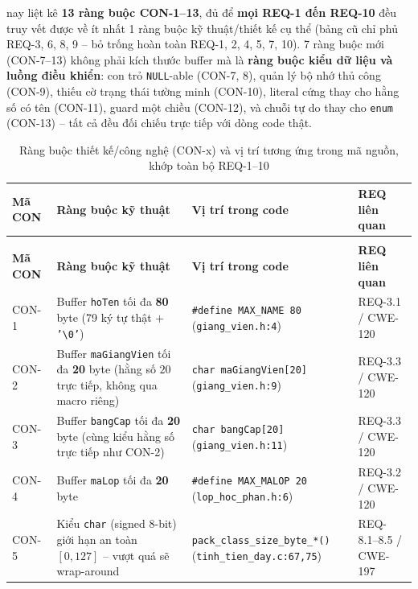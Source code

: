  nay liệt kê \textbf{13 ràng buộc CON-1--13}, đủ để \textbf{mọi REQ-1 đến REQ-10} đều truy vết được về ít nhất 1 ràng buộc kỹ thuật/thiết kế cụ thể (bảng cũ chỉ phủ REQ-3, 6, 8, 9 -- bỏ trống hoàn toàn REQ-1, 2, 4, 5, 7, 10). 7 ràng buộc mới (CON-7--13) không phải kích thước buffer mà là \textbf{ràng buộc kiểu dữ liệu và luồng điều khiển}: con trỏ \texttt{NULL}-able (CON-7, 8), quản lý bộ nhớ thủ công (CON-9), thiếu cờ trạng thái tường minh (CON-10), literal cứng thay cho hằng số có tên (CON-11), guard một chiều (CON-12), và chuỗi tự do thay cho \texttt{enum} (CON-13) -- tất cả đều đối chiếu trực tiếp với dòng code thật.

{\footnotesize
\renewcommand{\arraystretch}{1.2}
\begin{longtable}{@{} >{\raggedright\arraybackslash}p{1.1cm} >{\raggedright\arraybackslash}p{6.0cm} >{\raggedright\arraybackslash}p{4.6cm} >{\raggedright\arraybackslash}p{2.6cm} @{}}
  \caption{Ràng buộc thiết kế/công nghệ (CON-x) và vị trí tương ứng trong mã nguồn, khớp toàn bộ REQ-1--10}
  \label{tab:con} \\
  \toprule
  \textbf{Mã CON} & \textbf{Ràng buộc kỹ thuật} & \textbf{Vị trí trong code} & \textbf{REQ liên quan} \\
  \midrule
  \endfirsthead
  \multicolumn{4}{l}{\textit{\small(tiếp theo Bảng~\ref{tab:con})}} \\[3pt]
  \toprule
  \textbf{Mã CON} & \textbf{Ràng buộc kỹ thuật} & \textbf{Vị trí trong code} & \textbf{REQ liên quan} \\
  \midrule
  \endhead
  \bottomrule
  \endlastfoot
  CON-1 & Buffer \texttt{hoTen} tối đa \textbf{80} byte (79 ký tự thật $+$ \texttt{'\textbackslash0'}) & \texttt{\#define MAX\_NAME 80} (\texttt{giang\_vien.h:4}) & REQ-3.1 / CWE-120 \\
  CON-2 & Buffer \texttt{maGiangVien} tối đa \textbf{20} byte (hằng số $20$ trực tiếp, không qua macro riêng) & \texttt{char maGiangVien[20]} (\texttt{giang\_vien.h:9}) & REQ-3.3 / CWE-120 \\
  CON-3 & Buffer \texttt{bangCap} tối đa \textbf{20} byte (cùng kiểu hằng số trực tiếp như CON-2) & \texttt{char bangCap[20]} (\texttt{giang\_vien.h:11}) & REQ-3.3 / CWE-120 \\
  CON-4 & Buffer \texttt{maLop} tối đa \textbf{20} byte & \texttt{\#define MAX\_MALOP 20} (\texttt{lop\_hoc\_phan.h:6}) & REQ-3.2 / CWE-120 \\
  CON-5 & Kiểu \texttt{char} (signed 8-bit) giới hạn an toàn $[0,127]$ -- vượt quá sẽ wrap-around & \texttt{pack\_class\_size\_byte\_*()} (\texttt{tinh\_tien\_day.c:67,75}) & REQ-8.1--8.5 / CWE-197 \\

\end{longtable}}
